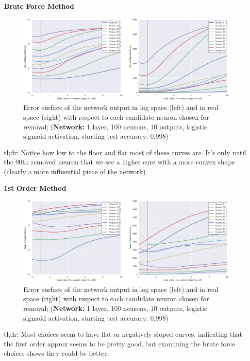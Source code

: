 \textbf{Brute Force Method}
\begin{figure}[!h]
\centering
\includegraphics[width=\linewidth]{png/mnist-acc99-gt-gain.pdf}
\caption{Error surface of the network output in log space (left) and in real space (right) with respect to each candidate neuron chosen for removal; (\textbf{Network:} 1 layer, 100 neurons, 10 outputs, logistic sigmoid activation, starting test accuracy: 0.998)}
\label{fig:mnist-gt-single-layer}
\end{figure}
tl;dr: Notice how low to the floor and flat most of these curves are. It's only until the 90th removed neuron that we see a higher cure with a more convex shape (clearly a more influential piece of the network)

\textbf{1st Order Method}
\begin{figure}[!h]
\centering
\includegraphics[width=\linewidth]{png/mnist-acc99-g1-gain.pdf}
\caption{Error surface of the network output in log space (left) and in real space (right) with respect to each candidate neuron chosen for removal; (\textbf{Network:} 1 layer, 100 neurons, 10 outputs, logistic sigmoid activation, starting test accuracy: 0.998)}
\label{fig:mnist-gt-single-layer}
\end{figure}
tl;dr: Most choices seem to have flat or negatively sloped curves, indicating that the first order approx seems to be pretty good, but examining the brute force choices shows they could be better. 


